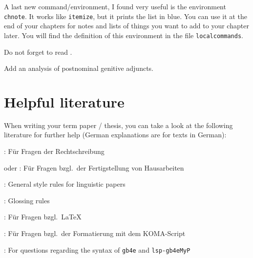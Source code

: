 A last new command/environment, I found very useful is the environment \verb|chnote|. It works like \texttt{itemize}, but it prints the list in blue. You can use it at the end of your chapters for notes and lists of things you want to add to your chapter later. You will find the definition of this environment in the file \texttt{localcommands}.

\begin{chnote}
	\item Do not forget to read \cite{Barwise&Co81a}.
	\item Add an analysis of postnominal genitive adjuncts.
\end{chnote}


\section{Helpful literature}
\label{ch:HelpLiterature}


When writing your term paper / thesis, you can take a look at the following literature for further help (German explanations are for texts in German):


\begin{itemize*}
	\item \citet{DR17a}: Für Fragen der Rechtschreibung 
	
	\item \citet{MyP17c} oder \citet{Rothstein11a}: Für Fragen bzgl.\ der Fertigstellung von Hausarbeiten
	
	\item \citet{Haspelmath14a}: General style rules for linguistic papers
	
	\item \citet{LeipzigGloss15a}: Glossing rules
	
	\item \citet{Freitag&MyP15a}: Für Fragen bzgl.\ \LaTeX\
	
	\item \citet{Kohm&Co13a}: Für Fragen bzgl.\ der Formatierung mit dem KOMA-Script
	
	\item \citet{Kolb&Co10a}: For questions regarding the syntax of \texttt{gb4e} and \texttt{lsp-gb4eMyP}
	
\end{itemize*}




